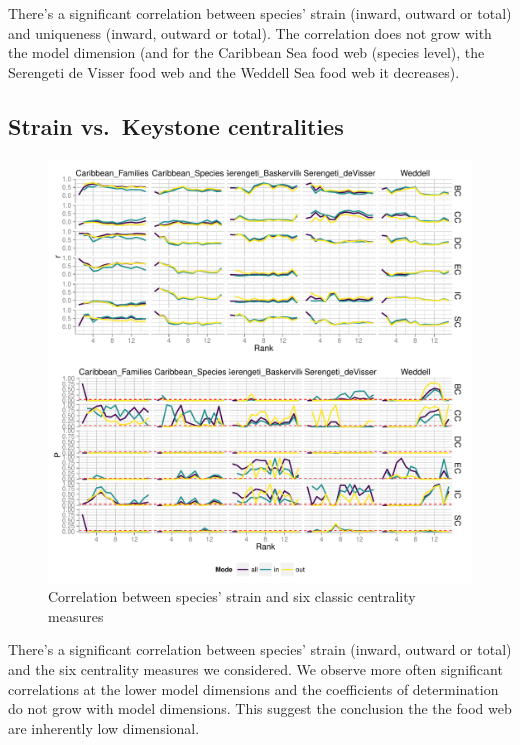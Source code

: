 \documentclass[11pt,article,oneside]{memoir}
\makeatletter
\def\maxwidth{\ifdim\Gin@nat@width>\linewidth\linewidth
\else\Gin@nat@width\fi}
\let\Oldincludegraphics\includegraphics
\renewcommand{\includegraphics}[1]{\Oldincludegraphics[width=\maxwidth]{#1}}
\makeatother
\begin{document}
There's a significant correlation between species' strain (inward,
outward or total) and uniqueness (inward, outward or total). The
correlation does not grow with the model dimension (and for the
Caribbean Sea food web (species level), the Serengeti de Visser food web
and the Weddell Sea food web it decreases).

\newpage

\subsection{Strain vs.~Keystone
centralities}\label{strain-vs.keystone-centralities}

\begin{figure}[htbp]
\centering
\includegraphics{Images/Strain_corr_rP.pdf}
\caption{Correlation between species' strain and six classic centrality
measures}
\end{figure}

There's a significant correlation between species' strain (inward,
outward or total) and the six centrality measures we considered. We
observe more often significant correlations at the lower model
dimensions and the coefficients of determination do not grow with model
dimensions. This suggest the conclusion the the food web are inherently
low dimensional.

\newpage
\end{document}
